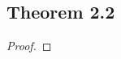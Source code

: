 \documentclass[../../main.tex]{subfiles}
\begin{document}
\subsection{Theorem 2.2}
\begin{wts}

\end{wts}
\begin{proof}

\end{proof}
\end{document}
